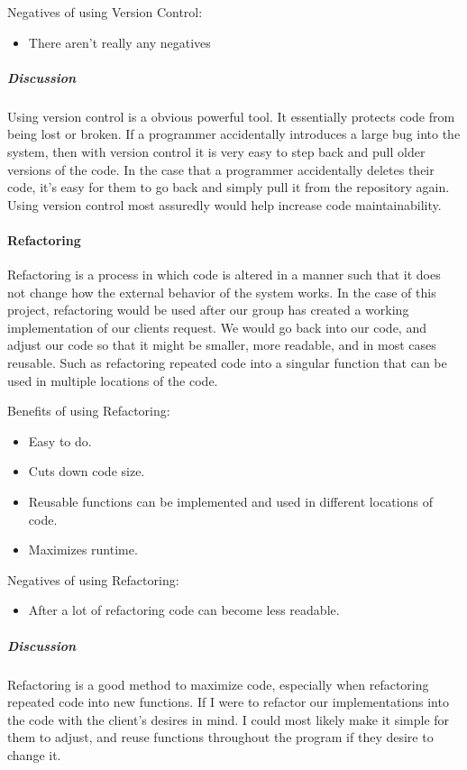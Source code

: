 Negatives of using Version Control:
\begin{itemize}
\item There aren't really any negatives
\end{itemize}

\subparagraph{Discussion}
\vspace{3mm}
Using version control is a obvious powerful tool.
It essentially protects code from being lost or broken.
If a programmer accidentally introduces a large bug into the system, then with version control it is very easy to step back and pull older versions of the code.
In the case that a programmer accidentally deletes their code, it's easy for them to go back and simply pull it from the repository again.
Using version control most assuredly would help increase code maintainability.

\paragraph{Refactoring}
Refactoring is a process in which code is altered in a manner such that it does not change how the external behavior of the system works.\cite{refactoring}
In the case of this project, refactoring would be used after our group has created a working implementation of our clients request.
We would go back into our code, and adjust our code so that it might be smaller, more readable, and in most cases reusable.
Such as refactoring repeated code into a singular function that can be used in multiple locations of the code.

Benefits of using Refactoring:
\begin{itemize}
\item Easy to do.
\item Cuts down code size.
\item Reusable functions can be implemented and used in different locations of code.
\item Maximizes runtime.
\end{itemize}

Negatives of using Refactoring:
\begin{itemize}
\item After a lot of refactoring code can become less readable.
\end{itemize}

\subparagraph{Discussion}
Refactoring is a good method to maximize code, especially when refactoring repeated code into new functions.
If I were to refactor our implementations into the code with the client's desires in mind.
I could most likely make it simple for them to adjust, and reuse functions throughout the program if they desire to change it.

